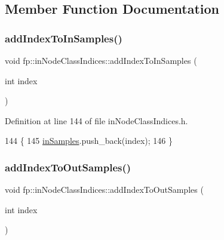 \subsection{Member Function Documentation}
\mbox{\label{classfp_1_1inNodeClassIndices_a37be5b697482b59dcba2ed4123464877}} 
\subsubsection{\texorpdfstring{add\+Index\+To\+In\+Samples()}{addIndexToInSamples()}}
{\footnotesize\ttfamily void fp\+::in\+Node\+Class\+Indices\+::add\+Index\+To\+In\+Samples (\begin{DoxyParamCaption}\item[{int}]{index }\end{DoxyParamCaption})\hspace{0.3cm}{\ttfamily [inline]}}



Definition at line 144 of file in\+Node\+Class\+Indices.\+h.


\begin{DoxyCode}
144                                                       \{
145                 \hyperlink{classfp_1_1inNodeClassIndices_ae830eec1ee5490f4fe4fb3d579ac78eb}{inSamples}.push\_back(index);
146             \}
\end{DoxyCode}
\mbox{\label{classfp_1_1inNodeClassIndices_afba0621732ce2df66125dfa0dbd2f3f7}} 
\subsubsection{\texorpdfstring{add\+Index\+To\+Out\+Samples()}{addIndexToOutSamples()}}
{\footnotesize\ttfamily void fp\+::in\+Node\+Class\+Indices\+::add\+Index\+To\+Out\+Samples (\begin{DoxyParamCaption}\item[{int}]{index }\end{DoxyParamCaption})\hspace{0.3cm}{\ttfamily [inline]}}



